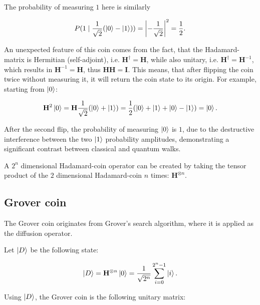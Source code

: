The probability of measuring $1$ here is similarly

\begin{align*}
P(1 \mid \frac{1}{\sqrt{2}} (\ket{0} - \ket{1})) =
\left\lvert-\frac{1}{\sqrt{2}}\right\rvert^2 =
\frac{1}{2}.
\end{align*}

An unexpected feature of this coin comes from the fact, that the Hadamard-matrix is Hermitian (self-adjoint), i.e. $\mathbf{H}^{\dagger} = \mathbf{H}$, while also unitary, i.e. $\mathbf{H}^{\dagger} = \mathbf{H}^{-1}$, which results in $\mathbf{H}^{-1} = \mathbf{H}$, thus $\mathbf{H}\mathbf{H} = \mathbf{I}$. This means, that after flipping the coin twice without measuring it, it will return the coin state to its origin. For example, starting from $\ket{0}$:

\begin{align*}
 \mathbf{H}^2 \ket{0} = \mathbf{H}\frac{1}{\sqrt{2}}(\ket{0} + \ket{1}) = \frac{1}{2}(\ket{0} + \ket{1} + \ket{0} - \ket{1}) = \ket{0}.
\end{align*}

After the second flip, the probability of measuring $\ket{0}$ is $1$, due to the destructive interference between the two $\ket{1}$ probability amplitudes, demonstrating a significant contrast between classical and quantum walks.

\begin{definition}

A $2^n$ dimensional Hadamard-coin operator can be created by taking the tensor product of the $2$ dimensional Hadamard-coin $n$ times: $\mathbf{H}^{\otimes{}n}$.

\end{definition}

\subsection{Grover coin}

The Grover coin originates from Grover's search algorithm, where it is applied as the diffusion operator.

Let $\ket{D}$ be the following state:

\begin{align*}
\ket{D} = \mathbf{H}^{\otimes{}n}\ket{0} =
\frac{1}{\sqrt{2^n}} \sum\limits_{i=0}^{2^n-1} \ket{i}.
\end{align*}

Using $\ket{D}$, the Grover coin is the following unitary matrix:

